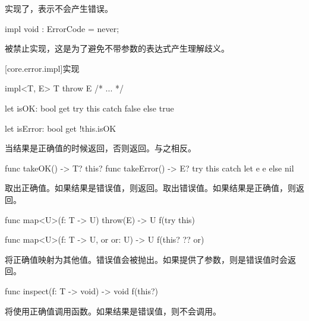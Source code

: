 \pnum
{}实现了，表示不会产生错误。

\begin{itemdecl}
impl void : ErrorCode = never;
\end{itemdecl}

\pnum
{}被禁止实现，这是为了避免不带参数的表达式产生理解歧义。

[core.error.impl]{实现}

\begin{itemdecl}
impl<T, E> T throw E { /* ... */ }
\end{itemdecl}

\begin{itemdecl}
let isOK: bool {
    get {
        try this catch { false } else { true }
    }
}

let isError: bool {
    get { !this.isOK }
}
\end{itemdecl}

\pnum
{}当结果是正确值的时候返回，否则返回。与之相反。

\begin{itemdecl}
func takeOK() -> T? { this? }
func takeError() -> E? { try this catch let e { e } else { nil } }
\end{itemdecl}

\pnum
{}取出正确值。如果结果是错误值，则返回。取出错误值。如果结果是正确值，则返回。

\begin{itemdecl}
func map<U>(f: T -> U) throw(E) -> U {
    f(try this)
}

func map<U>(f: T -> U, or or: U) -> U {
    f(this? ?? or)
}
\end{itemdecl}

\pnum
{}将正确值映射为其他值。错误值会被抛出。如果提供了参数，则是错误值时会返回。

\begin{itemdecl}
func inspect(f: T -> void) -> void {
    f(this?)
}
\end{itemdecl}

\pnum
{}将使用正确值调用函数。如果结果是错误值，则不会调用。

